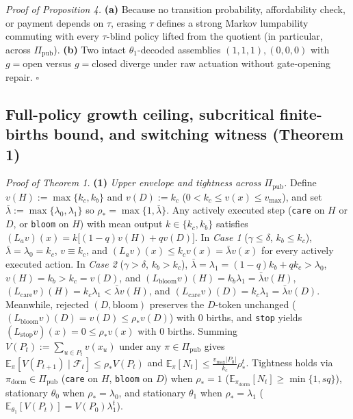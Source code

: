 \documentclass[11pt,letterpaper]{article}
\begin{document}
\emph{Proof of Proposition 4.} \textbf{(a)} Because no transition
probability, affordability check, or payment depends on \(\tau\),
erasing \(\tau\) defines a strong Markov lumpability
\citep{burkeRosenblatt1958} commuting with every \(\tau\)-blind policy
lifted from the quotient (in particular, across \(\Pi_{\mathrm{pub}}\)).
\textbf{(b)} Two intact \(\theta_1\)-decoded assemblies
\((1,1,1), (0,0,0)\) with \(g = \mathrm{open}\) versus
\(g = \mathrm{closed}\) diverge under raw actuation without gate-opening
repair. \(\square\)

\subsection{Full-policy growth ceiling, subcritical finite-births bound,
and switching witness (Theorem
1)}\label{full-policy-growth-ceiling-subcritical-finite-births-bound-and-switching-witness-theorem-1}

\emph{Proof of Theorem 1.} \textbf{(1)} \emph{Upper envelope and
tightness across \(\Pi_{\mathrm{pub}}\).} Define
\(v(H) := \max\{k_c, k_b\}\) and \(v(D) := k_c\)
(\(0 < k_c \le v(x) \le v_{\max}\)), and set
\(\bar{\lambda} := \max\{\lambda_0, \lambda_1\}\) so
\(\rho_* = \max\{1, \bar{\lambda}\}\). Any actively executed step
(\texttt{care} on \(H\) or \(D\), or \texttt{bloom} on \(H\)) with mean
output \(k \in \{k_c, k_b\}\) satisfies
\((L_a v)(x) = k\bigl[(1-q)v(H) + q v(D)\bigr]\). In \emph{Case 1}
(\(\gamma \le \delta\), \(k_b \le k_c\)),
\(\bar{\lambda} = \lambda_0 = k_c\), \(v \equiv k_c\), and
\((L_a v)(x) \le k_c v(x) = \bar{\lambda} v(x)\) for every actively
executed action. In \emph{Case 2} (\(\gamma > \delta\), \(k_b > k_c\)),
\(\bar{\lambda} = \lambda_1 = (1-q)k_b + q k_c > \lambda_0\),
\(v(H) = k_b > k_c = v(D)\), and
\((L_{\mathrm{bloom}}v)(H) = k_b\lambda_1 = \bar{\lambda} v(H)\),
\((L_{\mathrm{care}}v)(H) = k_c\lambda_1 < \bar{\lambda} v(H)\), and
\((L_{\mathrm{care}}v)(D) = k_c\lambda_1 = \bar{\lambda} v(D)\).
Meanwhile, rejected \((D,\mathrm{bloom})\) preserves the \(D\)-token
unchanged (\((L_{\mathrm{bloom}}v)(D) = v(D) \le \rho_* v(D)\)) with
\(0\) births, and \texttt{stop} yields
\((L_{\mathrm{stop}}v)(x) = 0 \le \rho_* v(x)\) with \(0\) births.
Summing \(V(P_t) := \sum_{u\in P_t} v(x_u)\) under any
\(\pi \in \Pi_{\mathrm{pub}}\) gives
\(\mathbb{E}_\pi[V(P_{t+1}) \mid \mathcal{F}_t] \le \rho_* V(P_t)\) and
\(\mathbb{E}_\pi[N_t] \le \frac{v_{\max}|P_0|}{k_c}\rho_*^t\). Tightness
holds via \(\pi_{\mathrm{dorm}} \in \Pi_{\mathrm{pub}}\) (\texttt{care}
on \(H\), \texttt{bloom} on \(D\)) when \(\rho_* = 1\)
(\(\mathbb{E}_{\pi_{\mathrm{dorm}}}[N_t] \ge \min\{1, sq\}\)),
stationary \(\theta_0\) when \(\rho_* = \lambda_0\), and stationary
\(\theta_1\) when \(\rho_* = \lambda_1\)
(\(\mathbb{E}_{\theta_1}[V(P_t)] = V(P_0)\lambda_1^t\)).
\end{document}

